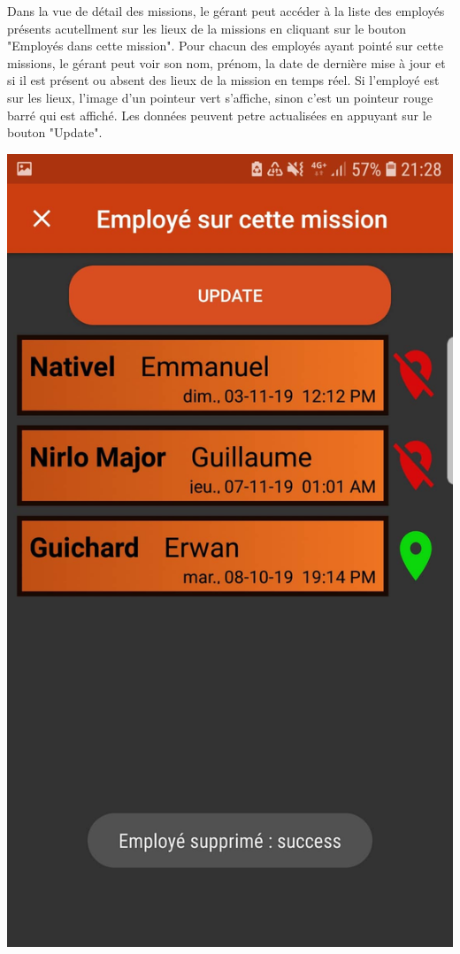 \documentclass{article}
\begin{document}
Dans la vue de détail des missions, le gérant peut accéder à la liste des employés présents acutellment sur les lieux de la missions en cliquant sur le bouton "Employés dans cette mission". Pour chacun des employés ayant pointé sur cette missions, le gérant peut voir son nom, prénom, la date de dernière mise à jour et si il est présent ou absent des lieux de la mission en temps réel. Si l'employé est sur les lieux, l'image d'un pointeur vert s'affiche, sinon c'est un pointeur rouge barré qui est affiché. Les données peuvent petre actualisées en appuyant sur le bouton "Update".
\begin{center}
    \includegraphics[scale=0.1]{pointage.jpg}

\end{center}
\end{document}
